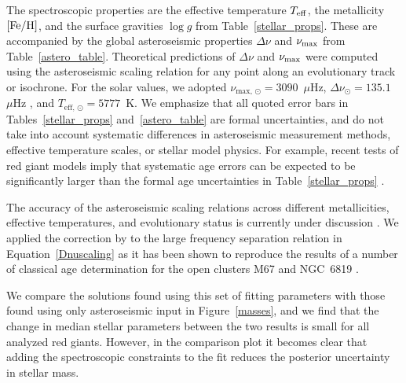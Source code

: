 \documentclass[modern]{aastex62}
\newcommand{\numax}{\mbox{$\nu_{\rm max}$}\xspace}
\newcommand{\Dnu}{\mbox{$\Delta \nu$}\xspace}
\newcommand{\teff}{\mbox{$T_{\rm eff}$}\xspace}
\newcommand{\logg}{\mbox{$\log g$}\xspace}
\newcommand{\feh}{\mbox{$\rm{[Fe/H]}$}\xspace}
\begin{document}
The spectroscopic properties are the effective temperature \teff, the metallicity \feh, and the surface gravities \logg from Table~\ref{stellar_props}. These are accompanied by the global asteroseismic properties \Dnu and \numax from Table~\ref{astero_table}. Theoretical predictions of \Dnu and \numax were computed using the asteroseismic scaling relation for any point along an evolutionary track or isochrone. For the solar values, we adopted $\nu_{\text{max, }\odot}=3090$~$\mu$Hz, $\Delta\nu_{\odot}=135.1$~$\mu$Hz \citep{huber2011}, and $T_{\text{eff, }\odot}=5777$~K. We emphasize that all quoted error bars in Tables~\ref{stellar_props} and~\ref{astero_table} are formal uncertainties, and do not take into account systematic differences in asteroseismic measurement methods, effective temperature scales, or stellar model physics. For example, recent tests of red giant models imply that systematic age errors can be expected to be significantly larger than the formal age uncertainties in Table~\ref{stellar_props} \citep{Tayar2017}.

The accuracy of the asteroseismic scaling relations across different metallicities, effective temperatures, and evolutionary status is currently under discussion \citep[see][]{white2011,belkacem2011,sharma2016,viani2017}.
We applied the correction by \cite{Serenelli:2017cn} to the large frequency separation relation in Equation~\ref{Dnuscaling} as it has been shown to reproduce the results of a number of classical age determination for the open clusters M67 \citep{stello2016} and NGC~6819 \citep{casagrande2016}.

We compare the solutions found using this set of fitting parameters with those found using only asteroseismic input in Figure~\ref{masses}, and we find that the change in median stellar parameters between the two results is small for all analyzed red giants. However, in the comparison plot it becomes clear that adding the spectroscopic constraints to the fit reduces the posterior uncertainty in stellar mass.
\end{document}
